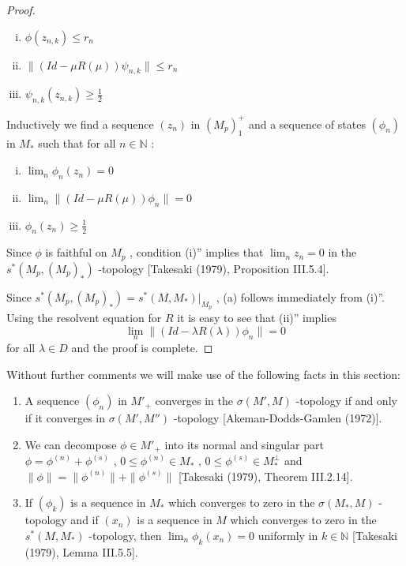 \begin{proof}
\begin{enumerate}[(i)']
\item
$ \phi(z_{n,k}) \leq r_{n} $ 

\item
$ \|(Id - \mu R(\mu))\psi_{n,k}\| \leq r_{n} $ 

\item
$ \psi_{n,k}(z_{n,k}) \geq \frac{1}{2} $ 
\end{enumerate}

Inductively we find a sequence $ (z_{n}) $  in $ (M_{p})_{1}^{+} $  and a sequence of states $ (\phi_{n}) $  in $ M_{*} $  such that for all $ n \in \mathbb{N} $ :

\begin{enumerate}[(i)'']
\item
$ \lim_{n} \phi_{n}(z_{n}) = 0 $ 

\item
$ \lim_{n} \|(Id - \mu R(\mu))\phi_{n}\| = 0 $ 

\item
$ \phi_{n}(z_{n}) \geq \frac{1}{2} $ 
\end{enumerate}

Since $ \phi $  is faithful on $ M_{p} $ , condition (i)'' implies that $ \lim_{n} z_{n} = 0 $  in the $ s^{*}(M_{p},(M_{p})_{*}) $ -topology [Takesaki (1979), Proposition III.5.4].

\newpage

Since $ s^{*}(M_{p},(M_{p})_{*}) = s^{*}(M,M_{*})|_{M_{p}} $ , (a) follows immediately from (i)''.
Using the resolvent equation for $ R $  it is easy to see that (ii)'' implies
\[
\lim_{n} \|(Id - \lambda R(\lambda))\phi_{n}\| = 0
\]
for all $ \lambda \in D $  and the proof is complete.
\end{proof}

Without further comments we will make use of the following facts in this section:

\begin{enumerate}[(1)]
\item
A sequence $ (\phi_{n}) $  in $ M'_{+} $  converges in the $ \sigma(M',M) $ -topology if and only if it converges in $ \sigma(M',M'') $ -topology [Akeman-Dodds-Gamlen (1972)].

\item
We can decompose $ \phi \in M'_{+} $  into its normal and singular part $ \phi = \phi^{(n)} + \phi^{(s)} $ , $ 0 \leq \phi^{(n)} \in M_{*} $ , $ 0 \leq \phi^{(s)} \in M_*^{\perp} $  and $ \|\phi\| = \|\phi^{(n)}\| + \|\phi^{(s)}\| $  [Takesaki (1979), Theorem III.2.14].

\item
If $ (\phi_{k}) $  is a sequence in $ M_{*} $  which converges to zero in the $ \sigma(M_{*},M) $ -topology and if $ (x_{n}) $  is a sequence in $ M $  which converges to zero in the $ s^{*}(M,M_{*}) $ -topology, then $ \lim_{n} \phi_{k}(x_{n}) = 0 $  uniformly in $ k \in \mathbb{N} $  [Takesaki (1979), Lemma III.5.5].
\end{enumerate}

